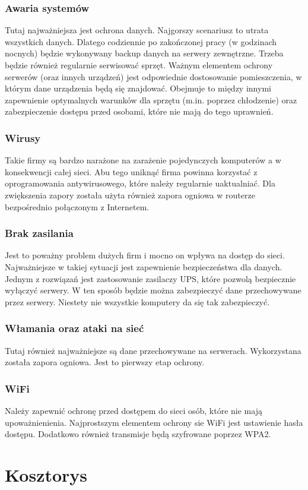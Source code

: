 \documentclass{article}
\begin{document}
\subsubsection{Awaria systemów}
Tutaj najważniejsza jest ochrona danych.  Najgorszy scenariusz to utrata wszystkich danych. Dlatego codziennie po zakończonej pracy (w godzinach nocnych) będzie wykonywany backup danych na serwery zewnętrzne. Trzeba będzie również regularnie serwisować sprzęt. Ważnym elementem ochrony serwerów (oraz innych urządzeń) jest odpowiednie dostosowanie pomieszczenia, w którym dane urządzenia będą się znajdować. Obejmuje to między innymi zapewnienie optymalnych warunków dla sprzętu (m.in. poprzez chłodzenie) oraz zabezpieczenie dostępu przed osobami, które nie mają do tego uprawnień.

\subsubsection{Wirusy}
Takie firmy są bardzo narażone na zarażenie pojedynczych komputerów a w konsekwencji całej sieci. Abu tego uniknąć firma powinna korzystać z oprogramowania antywirusowego, które należy regularnie uaktualniać. Dla zwiększenia zapory została użyta również zapora ogniowa w routerze bezpośrednio połączonym z Internetem.

\subsubsection{Brak zasilania}
Jest to poważny problem dużych firm i mocno on wpływa na dostęp do sieci. Najważniejsze w takiej sytuacji jest zapewnienie bezpieczeństwa dla danych. 
Jednym z rozwiązań jest zastosowanie zasilaczy UPS, które pozwolą bezpiecznie wyłączyć serwery.  W ten sposób będzie można zabezpieczyć dane przechowywane przez serwery. Niestety nie wszystkie komputery da się tak zabezpieczyć.

\subsubsection{Włamania oraz ataki na sieć}
Tutaj również najważniejsze są dane przechowywane na serwerach.
Wykorzystana została zapora ogniowa. Jest to pierwszy etap ochrony.

\subsubsection{WiFi}
Należy zapewnić ochronę przed dostępem do sieci osób, które nie mają upoważnienienia.
Najprostszym elementem ochrony sie WiFi jest ustawienie hasła dostępu. Dodatkowo również transmisje będą szyfrowane poprzez WPA2.

\newpage
\section{Kosztorys}
\end{document}
